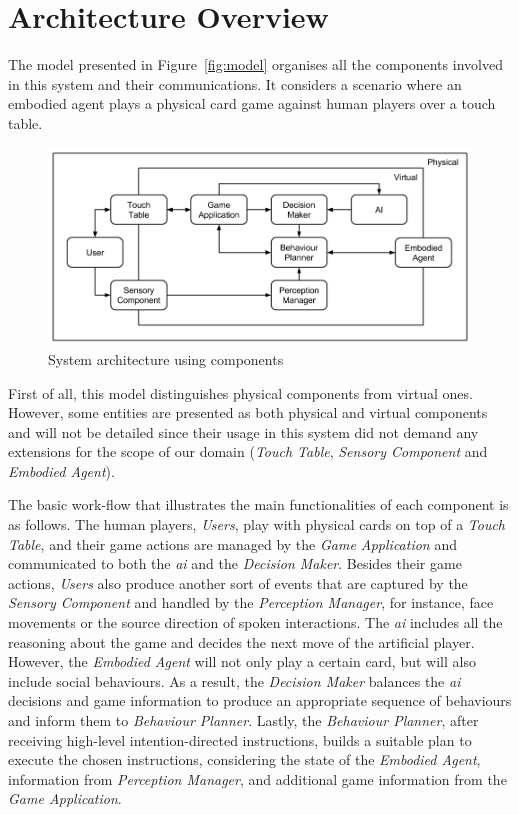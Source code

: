 \section{Architecture Overview}
\label{section:architecture_overview}

The model presented in Figure~\ref{fig:model} organises all the components involved in this system and their communications.
It considers a scenario where an embodied agent plays a physical card game against human players over a touch table.

\begin{figure}[ht]
  \centering
    \includegraphics[width=1\textwidth]{./img/architecture}
  \caption{System architecture using components}
\label{fig:architecture}
\end{figure}

First of all, this model distinguishes physical components from virtual ones.
However, some entities are presented as both physical and virtual components and will not be detailed since their usage in this system did not demand any extensions for the scope of our domain (\emph{Touch Table}, \emph{Sensory Component} and \emph{Embodied Agent}).

The basic work-flow that illustrates the main functionalities of each component is as follows.
The human players, \emph{Users}, play with physical cards on top of a \emph{Touch Table}, and their game actions are managed by the \emph{Game Application} and communicated to both the \emph{\ac{ai}} and the \emph{Decision Maker}.
Besides their game actions, \emph{Users} also produce another sort of events that are captured by the \emph{Sensory Component} and handled by the \emph{Perception Manager}, for instance, face movements or the source direction of spoken interactions.
The \emph{\ac{ai}} includes all the reasoning about the game and decides the next move of the artificial player.
However, the \emph{Embodied Agent} will not only play a certain card, but will also include social behaviours.
As a result, the \emph{Decision Maker} balances the \emph{\ac{ai}} decisions and game information to produce an appropriate sequence of behaviours and inform them to \emph{Behaviour Planner}.
Lastly, the \emph{Behaviour Planner}, after receiving high-level intention-directed instructions, builds a suitable plan to execute the chosen instructions, considering the state of the \emph{Embodied Agent}, information from \emph{Perception Manager}, and additional game information from the \emph{Game Application}.

